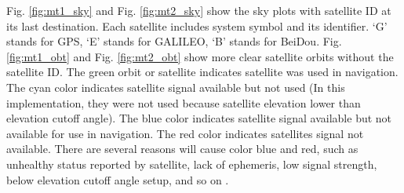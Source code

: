 \documentclass[letterpaper, 10 pt,onecolumn]{article}
\begin{document}
	Fig. \ref{fig:mt1_sky} and Fig. \ref{fig:mt2_sky} show the sky plots with satellite ID at its last destination. Each satellite includes system symbol and its identifier. `G' stands for GPS, `E' stands for GALILEO, `B' stands for BeiDou. Fig. \ref{fig:mt1_obt} and Fig. \ref{fig:mt2_obt} show more clear satellite orbits without the satellite ID. The green orbit or satellite indicates satellite was used in navigation. The cyan color indicates satellite signal available but not used (In this implementation, they were not used because satellite elevation lower than elevation cutoff angle). The blue color indicates satellite signal available but not available for use in navigation. The red color indicates satellites signal not available. There are several reasons will cause color blue and red, such as unhealthy status reported by satellite, lack of ephemeris, low signal strength, below elevation cutoff angle setup, and so on \cite{ucenter}. 
	
\end{document}
